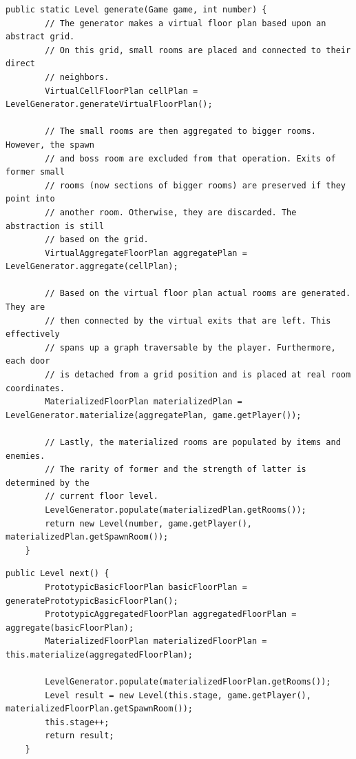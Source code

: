 \vspace{0.5cm}
\begin{lstlisting}[caption={Code Smell: Code Comments (Vorher)}]
    public static Level generate(Game game, int number) {
        // The generator makes a virtual floor plan based upon an abstract grid.
        // On this grid, small rooms are placed and connected to their direct
        // neighbors.
        VirtualCellFloorPlan cellPlan = LevelGenerator.generateVirtualFloorPlan();
        
        // The small rooms are then aggregated to bigger rooms. However, the spawn
        // and boss room are excluded from that operation. Exits of former small
        // rooms (now sections of bigger rooms) are preserved if they point into
        // another room. Otherwise, they are discarded. The abstraction is still
        // based on the grid.
        VirtualAggregateFloorPlan aggregatePlan = LevelGenerator.aggregate(cellPlan);
        
        // Based on the virtual floor plan actual rooms are generated. They are
        // then connected by the virtual exits that are left. This effectively
        // spans up a graph traversable by the player. Furthermore, each door
        // is detached from a grid position and is placed at real room coordinates.
        MaterializedFloorPlan materializedPlan = LevelGenerator.materialize(aggregatePlan, game.getPlayer());
        
        // Lastly, the materialized rooms are populated by items and enemies.
        // The rarity of former and the strength of latter is determined by the
        // current floor level.
        LevelGenerator.populate(materializedPlan.getRooms());
        return new Level(number, game.getPlayer(), materializedPlan.getSpawnRoom());
    }
\end{lstlisting}

\vspace{0.5cm}
\begin{lstlisting}[caption={Code Smell: Code Comments (Nachher)}]
    public Level next() {
        PrototypicBasicFloorPlan basicFloorPlan = generatePrototypicBasicFloorPlan();
        PrototypicAggregatedFloorPlan aggregatedFloorPlan = aggregate(basicFloorPlan);
        MaterializedFloorPlan materializedFloorPlan = this.materialize(aggregatedFloorPlan);
        
        LevelGenerator.populate(materializedFloorPlan.getRooms());
        Level result = new Level(this.stage, game.getPlayer(), materializedFloorPlan.getSpawnRoom());
        this.stage++;
        return result;
    }
\end{lstlisting}


